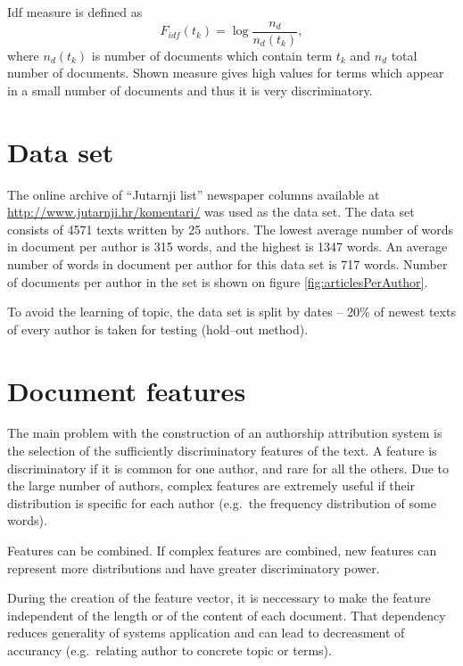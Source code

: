 \documentclass[11pt,english]{article}
\begin{document}
\begin{multicols}{2}
Idf measure is defined as
\begin{equation}
F_{idf}(t_k) = \log \frac{n_d}{n_d(t_k)},
\label{equ:idf}
\end{equation}
where $n_d(t_k)$ is number of documents which contain term $t_k$ and $n_d$
total number of documents. Shown measure gives high values for terms which
appear in a small number of documents and thus it is very discriminatory.

\section{Data set}
\label{sec:podatci}
The online archive of ``Jutarnji list'' newspaper columns available at
\url{http://www.jutarnji.hr/komentari/} was used as the data set. The data set
consists of 4571 texts written by 25 authors. The lowest average number of words
in document per author is 315 words, and the highest is 1347 words. An
average number of words in document per author for this data set is 717 words. Number
of documents per author in the set is shown on figure
\ref{fig:articlesPerAuthor}.

To avoid the learning of topic, the data set is split by dates
-- 20\% of newest texts of every author is taken for testing (hold--out method).

\begin{minipage}{0.8\linewidth}
\vspace{10pt}
\centerline{\resizebox{1.4\linewidth}{!}{}}%
%
\label{fig:articlesPerAuthor}
\end{minipage}

\section{Document features}
The main problem with the construction of an authorship attribution system is the
selection of the sufficiently discriminatory features of the text. A feature is
discriminatory if it is common for one author, and rare for all the others. Due to the
large number of authors, complex features are extremely useful if their
distribution is specific for each author (e.g.\ the frequency distribution
of some words).

Features can be combined. If complex features are combined, new features can
represent more distributions and have greater discriminatory power.

During the creation of the feature vector, it is neccessary to make the
feature independent of the length or of the content of each document. That dependency reduces
generality of systems application and can lead to decreasment of accurancy
(e.g.\ relating author to concrete topic or terms).


\end{multicols}
\end{document}

